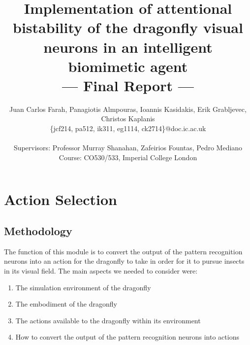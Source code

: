 \documentclass[a4paper,11pt]{article}
\title{Implementation of attentional bistability of the dragonfly visual neurons in an intelligent biomimetic agent\\\Large{--- Final Report ---}}
\author{Juan Carlos Farah, Panagiotis Almpouras, Ioannis Kasidakis, Erik Grabljevec, Christos Kaplanis\\
       \{jcf214, pa512, ik311, eg1114, ck2714\}@doc.ic.ac.uk\\ \\
       \small{Supervisors: Professor Murray Shanahan, Zafeirios Fountas, Pedro Mediano}\\
       \small{Course: CO530/533, Imperial College London}
}
\begin{document}
\section{Action Selection}
\subsection{Methodology}
The function of this module is to convert the output of the pattern recognition neurons into an action for the dragonfly to take in order for it to pursue insects in its visual field.
The main aspects we needed to consider were:
\begin{enumerate}
	\item The simulation environment of the dragonfly
	\item The embodiment of the dragonfly
	\item The actions available to the dragonfly within its environment
	\item How to convert the output of the pattern recognition neurons into actions
\end{enumerate}
\end{document}
